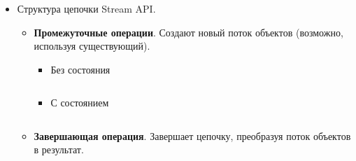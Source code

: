 \begin{frame}
\frametitle{\insertsection} 
\framesubtitle{\insertsubsection}
\begin{itemize}
	\item Структура цепочки Stream API.
	\begin{itemize}
		\item \textbf{Промежуточные операции}. Создают новый поток объектов (возможно, используя существующий).
		\begin{itemize}
			\item Без состояния
			\inputminted{java}{code/Stateless.java}
			\item С состоянием
			\inputminted{java}{code/Stateful.java}
		\end{itemize}
		\item \textbf{Завершающая операция}. Завершает цепочку, преобразуя поток объектов в результат.
		\inputminted{java}{code/Termination.java}
	\end{itemize}
\end{itemize}
\end{frame}
